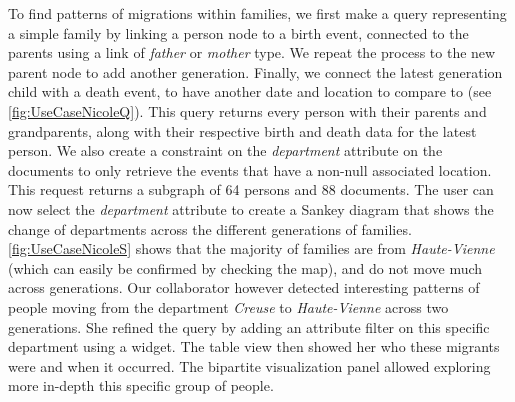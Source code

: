 To find patterns of migrations within families, we first make a query representing a simple family by linking a person node to a birth event, connected to the parents using a link of \textit{father} or \textit{mother} type. We repeat the process to the new parent node to add another generation. Finally, we connect the latest generation child with a death event, to have another date and location to compare to (see \autoref{fig:UseCaseNicoleQ}). This query returns every person with their parents and grandparents, along with their respective birth and death data for the latest person. We also create a constraint on the \textit{department} attribute on the documents to only retrieve the events that have a non-null associated location. This request returns a subgraph of 64 persons and 88 documents. The user can now select the \textit{department} attribute to create a Sankey diagram that shows the change of departments across the different generations of families. \autoref{fig:UseCaseNicoleS} shows that the majority of families are from \textit{Haute-Vienne} (which can easily be confirmed by checking the map), and do not move much across generations. Our collaborator however detected interesting patterns of people moving from the department \textit{Creuse} to \textit{Haute-Vienne} across two generations. She refined the query by adding an attribute filter on this specific department using a widget. The table view then showed her who these migrants were and when it occurred. The bipartite visualization panel allowed exploring more in-depth this specific group of people. %


